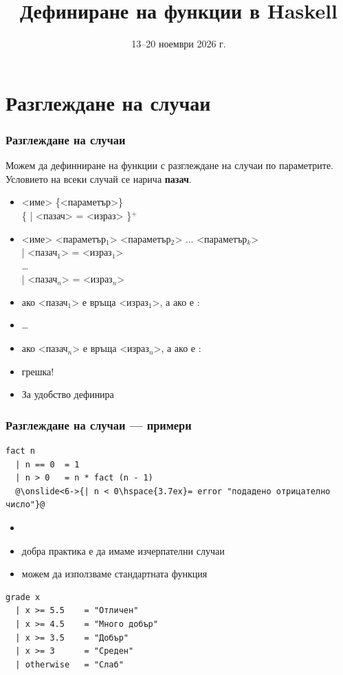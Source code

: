 \documentclass[alsotrans,beameroptions={aspectratio=169}]{beamerswitch}
\title{Дефиниране на функции в Haskell}
\date{13--20 ноември 2026 г.}
\begin{document}
\begin{frame}
  \titlepage
\end{frame}

\section{Разглеждане на случаи}

\begin{frame}[fragile]
  \frametitle{Разглеждане на случаи}

  Можем да дефинниране на функции с разглеждане на случаи по параметрите.\\
  Условието на всеки случай се нарича \textbf{пазач}.
  \begin{itemize}
    \item{} <име> \{<параметър>\}\\
      \hspace{3ex} \{ \tta| <пазач> \tta= <израз> \}$^+$
      \pause
    \item{} <име> <параметър$_1$> <параметър$_2$> ... <параметър$_k$>\\
      \hspace{3ex} \tta| <пазач$_1$> \tta= <израз$_1$>\\
      \hspace{3ex} \ldots\\
      \hspace{3ex} \tta| <пазач$_n$> \tta= <израз$_n$>\\
      \pause
    \item ако <пазач$_1$> е  връща <израз$_1$>, а ако е :
    \item \ldots
    \item ако <пазач$_n$> е  връща <израз$_n$>, а ако е :
    \item \alert{грешка!}
      \pause
    \item За удобство  дефинира 
  \end{itemize}
\end{frame}

\begin{frame}[fragile]
  \frametitle{Разглеждане на случаи --- примери}

\begin{lstlisting}
fact n
  | n == 0  = 1
  | n > 0   = n * fact (n - 1)
  @\onslide<6->{| n < 0\hspace{3.7ex}= error "подадено отрицателно число"}@
\end{lstlisting}
\onslide<+->
\begin{itemize}[<+->]
\item {}
\item добра практика е да имаме изчерпателни случаи
\item можем да използваме стандартната функция 
\end{itemize}
\onslide<+->
\onslide<+->
\begin{lstlisting}
grade x
  | x >= 5.5    = "Отличен"
  | x >= 4.5    = "Много добър"
  | x >= 3.5    = "Добър"
  | x >= 3      = "Среден"
  | otherwise   = "Слаб"
\end{lstlisting}
\end{frame}
\end{document}

